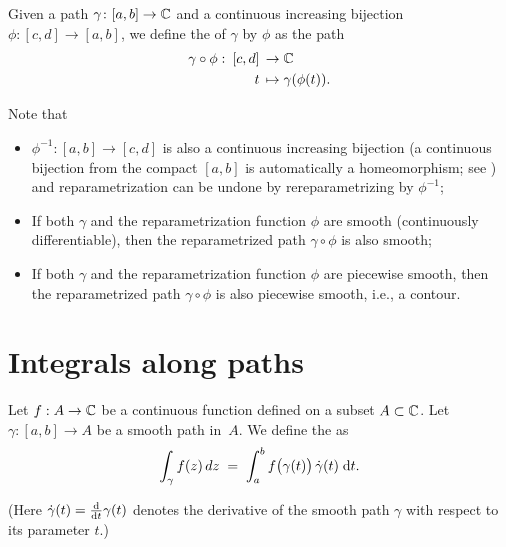 \begin{definition}
  \label{def:path_reparametrization}
  Given a path $\gamma \colon [a,b] \to \mathbb{C}$ and a continuous increasing
  bijection $\phi \colon [c,d] \to [a,b]$, we define the 
  of $\gamma$ by $\phi$ as the path
  \begin{align*}
    \gamma \circ \phi \, \colon \, [c,d] \, \to \; & \mathbb{C} \\
    t \, \mapsto \; & \gamma(\phi(t)) .
  \end{align*}

  Note that
  \begin{itemize}
    \item $\phi^{-1} \colon [a,b] \to [c,d]$ is also a continuous increasing
      bijection (a continuous bijection from the
      compact $[a,b]$ is automatically a homeomorphism; see ) and
      reparametrization can be undone by rereparametrizing by $\phi^{-1}$;
      \item If both $\gamma$ and the reparametrization function $\phi$ are
      smooth (continuously differentiable), then the reparametrized
      path $\gamma \circ \phi$ is also smooth;
      \item If both $\gamma$ and the reparametrization function $\phi$ are
      piecewise smooth, then the reparametrized path $\gamma \circ \phi$
      is also piecewise smooth, i.e., a contour.
  \end{itemize}
\end{definition}



\section{Integrals along paths}

\begin{definition}
  \label{def:smooth_contour_integral}
  Let $f : A \to \mathbb{C}$ be a continuous function defined on a subset $A \subset \mathbb{C}$.
  Let $\gamma \colon [a,b] \to A$ be a smooth path in~$A$.
  We define the  as
  \begin{align*}
    \int_\gamma f(z) \, dz
    \; = \; \int_a^b f \big( \gamma(t) \big) \, \dot{\gamma}(t) \; \mathrm{d} t .
  \end{align*}

  (Here $\dot{\gamma}(t) = \frac{\mathrm{d}}{\mathrm{d} t} \gamma(t)$ denotes the derivative of
  the smooth path $\gamma$ with respect to its parameter $t$.)
\end{definition}

